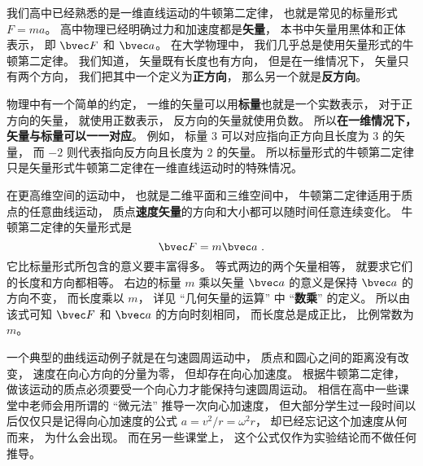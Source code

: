 
\begin{issues}
\issueTODO
\end{issues}


我们高中已经熟悉的是一维直线运动的牛顿第二定律， 也就是常见的标量形式 $F = ma$。 高中物理已经明确过力和加速度都是\textbf{矢量}， 本书中矢量用黑体和正体表示， 即 $\bvec F$ 和 $\bvec a$。 在大学物理中， 我们几乎总是使用矢量形式的牛顿第二定律。 我们知道， 矢量既有长度也有方向， 但是在一维情况下， 矢量只有两个方向， 我们把其中一个定义为\textbf{正方向}， 那么另一个就是\textbf{反方向}。

物理中有一个简单的约定， 一维的矢量可以用\textbf{标量}也就是一个实数表示， 对于正方向的矢量， 就使用正数表示， 反方向的矢量就使用负数。 所以\textbf{在一维情况下， 矢量与标量可以一一对应}。 例如， 标量 $3$ 可以对应指向正方向且长度为 $3$ 的矢量， 而 $-2$ 则代表指向反方向且长度为 $2$ 的矢量。 所以标量形式的牛顿第二定律只是矢量形式牛顿第二定律在一维直线运动时的特殊情况。

在更高维空间的运动中， 也就是二维平面和三维空间中， 牛顿第二定律适用于质点的任意曲线运动， 质点\textbf{速度矢量}的方向和大小都可以随时间任意连续变化。 牛顿第二定律的矢量形式是
\begin{equation}
\bvec F = m\bvec a~.
\end{equation}
它比标量形式所包含的意义要丰富得多。 等式两边的两个矢量相等， 就要求它们的长度和方向都相等。 右边的标量 $m$ 乘以矢量 $\bvec a$ 的意义是保持 $\bvec a$ 的方向不变， 而长度乘以 $m$， 详见 “几何矢量的运算” 中 “\textbf{数乘}” 的定义。 所以由该式可知 $\bvec F$ 和 $\bvec a$ 的方向时刻相同， 而长度总是成正比， 比例常数为 $m$。

一个典型的曲线运动例子就是在匀速圆周运动中， 质点和圆心之间的距离没有改变， 速度在向心方向的分量为零， 但却存在向心加速度。 根据牛顿第二定律， 做该运动的质点必须要受一个向心力才能保持匀速圆周运动。 相信在高中一些课堂中老师会用所谓的 “微元法” 推导一次向心加速度， 但大部分学生过一段时间以后仅仅只是记得向心加速度的公式 $a = v^2/r = \omega^2 r$， 却已经忘记这个加速度从何而来， 为什么会出现。 而在另一些课堂上， 这个公式仅作为实验结论而不做任何推导。

